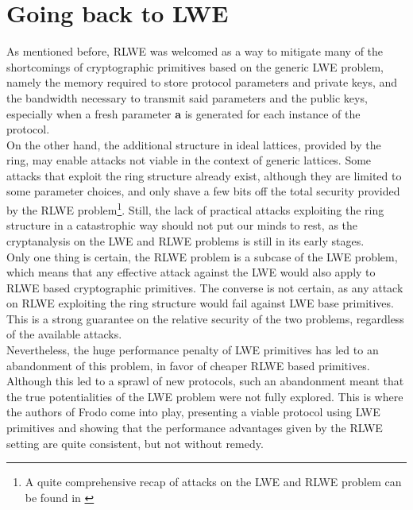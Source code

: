\section{Going back to LWE}
As mentioned before, RLWE was welcomed as a way to mitigate many of the shortcomings of cryptographic primitives based on the generic LWE problem, namely the memory required to store protocol parameters and private keys, and the bandwidth necessary to transmit said parameters and the public keys, especially when a fresh parameter \textbf{a} is generated for each instance of the protocol.\\
On the other hand, the additional structure in ideal lattices, provided by the ring, may enable attacks not viable in the context of generic lattices. Some attacks that exploit the ring structure already exist, although they are limited to some parameter choices, and only shave a few bits off the total security provided by the RLWE problem\footnote{A quite comprehensive recap of attacks on the LWE and RLWE problem can be found in \cite{RLWE_attacks}}. Still, the lack of practical attacks exploiting the ring structure in a catastrophic way should not put our minds to rest, as the cryptanalysis on the LWE and RLWE problems is still in its early stages.\\
Only one thing is certain, the RLWE problem is a subcase of the LWE problem, which means that any effective attack against the LWE would also apply to RLWE based cryptographic primitives. The converse is not certain, as any attack on RLWE exploiting the ring structure would fail against LWE base primitives. This is a strong guarantee on the relative security of the two problems, regardless of the available attacks.\\
Nevertheless, the huge performance penalty of LWE primitives has led to an abandonment of this problem, in favor of cheaper RLWE based primitives. Although this led to a sprawl of new protocols, such an abandonment meant that the true potentialities of the LWE problem were not fully explored. This is where the authors of Frodo \cite{frodo} come into play, presenting a viable protocol using LWE primitives and showing that the performance advantages given by the RLWE setting are quite consistent, but not without remedy. 

